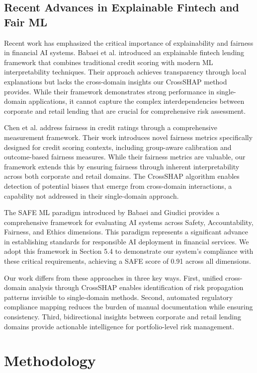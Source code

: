 \documentclass[a4paper,11pt,twoside]{article}
\newcommand{\0}{\Bf{0}}
\theoremstyle{definition}
\begin{document}
\subsection{Recent Advances in Explainable Fintech and Fair ML}

Recent work has emphasized the critical importance of explainability and fairness in financial AI systems. Babaei et al. \cite{ref19} introduced an explainable fintech lending framework that combines traditional credit scoring with modern ML interpretability techniques. Their approach achieves transparency through local explanations but lacks the cross-domain insights our CrossSHAP method provides. While their framework demonstrates strong performance in single-domain applications, it cannot capture the complex interdependencies between corporate and retail lending that are crucial for comprehensive risk assessment.

Chen et al. \cite{ref20} address fairness in credit ratings through a comprehensive measurement framework. Their work introduces novel fairness metrics specifically designed for credit scoring contexts, including group-aware calibration and outcome-based fairness measures. While their fairness metrics are valuable, our framework extends this by ensuring fairness through inherent interpretability across both corporate and retail domains. The CrossSHAP algorithm enables detection of potential biases that emerge from cross-domain interactions, a capability not addressed in their single-domain approach.

The SAFE ML paradigm introduced by Babaei and Giudici \cite{ref21} provides a comprehensive framework for evaluating AI systems across Safety, Accountability, Fairness, and Ethics dimensions. This paradigm represents a significant advance in establishing standards for responsible AI deployment in financial services. We adopt this framework in Section 5.4 to demonstrate our system's compliance with these critical requirements, achieving a SAFE score of 0.91 across all dimensions.

Our work differs from these approaches in three key ways. First, unified cross-domain analysis through CrossSHAP enables identification of risk propagation patterns invisible to single-domain methods. Second, automated regulatory compliance mapping reduces the burden of manual documentation while ensuring consistency. Third, bidirectional insights between corporate and retail lending domains provide actionable intelligence for portfolio-level risk management.
\section{Methodology}
\end{document}
